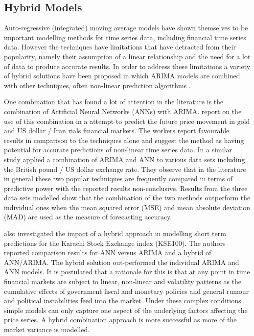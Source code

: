 \subsection{Hybrid Models}
Auto-regressive (integrated) moving average models have shown themselves to be important modelling methods for time series data, including financial time series data. However the techniques have limitations that have detracted from their popularity, namely their assumption of a linear relationship and the need for a lot of data to produce accurate results. In order to address these limitations a variety of hybrid solutions have been proposed in which ARIMA models are combined with other techniques, often non-linear prediction algorithms \citep{Wang2012758,Khashei20124344,Aladag20091467}.

One combination that has found a lot of attention in the literature is the combination of Artificial Neural Networks (ANNs) with ARIMA. \cite{Khashei2009956} report on the use of this combination in a attempt to predict the future price movement in gold and US dollar / Iran rials financial markets. The workers report favourable results in comparison to the techniques alone and suggest the method as having potential for accurate predictions of non-linear time series data. In a similar study \cite{Zhang2003159} applied a combination of ARIMA and ANN to various data sets including the British pound / US dollar exchange rate. They observe that in the literature in general these two popular techniques are frequently compared in terms of predictive power with the reported results non-conclusive. Results from the three data sets modelled show that the combination of the two methods outperform the individual ones when the mean squared error (MSE) and mean
absolute deviation (MAD) are used as the measure of forecasting accuracy.

\cite{Fatima20082742} also investigated the impact of a hybrid approach in modelling short term predictions for the Karachi Stock Exchange index (KSE100). The authors reported comparison results for ANN versus ARIMA and a hybrid of ANN/ARIMA. The hybrid solution out-performed the individual ARIMA and ANN models. It is postulated that a rationale for this is that at any point in time financial markets are subject to linear, non-linear and volatility patterns as the cumulative effects of government fiscal and monetary policies and general rumour and political instabilities feed into the market. Under these complex conditions simple models can only capture one aspect of the underlying factors affecting the price series. A hybrid combination approach is more successful as more of the market variance is modelled.

